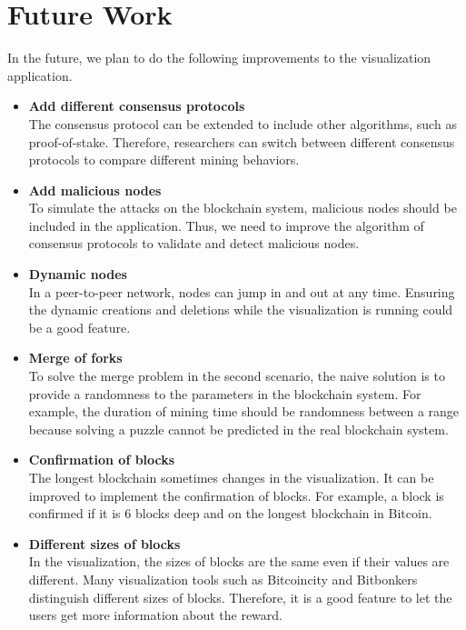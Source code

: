 \section{Future Work}

In the future, we plan to do the following improvements to the visualization application.

\begin{itemize}
    \item \textbf{Add different consensus protocols} \\
        The consensus protocol can be extended to include other algorithms, such as proof-of-stake. Therefore, researchers can switch between different consensus protocols to compare different mining behaviors.
    \item \textbf{Add malicious nodes} \\
        To simulate the attacks on the blockchain system, malicious nodes should be included in the application. Thus, we need to improve the algorithm of consensus protocols to validate and detect malicious nodes.
    \item \textbf{Dynamic nodes} \\
        In a peer-to-peer network, nodes can jump in and out at any time. Ensuring the dynamic creations and deletions while the visualization is running could be a good feature.
    \item \textbf{Merge of forks} \\
        To solve the merge problem in the second scenario, the naive solution is to provide a randomness to the parameters in the blockchain system. For example, the duration of mining time should be randomness between a range because solving a puzzle cannot be predicted in the real blockchain system.
    \item \textbf{Confirmation of blocks} \\
        The longest blockchain sometimes changes in the visualization. It can be improved to implement the confirmation of blocks. For example, a block is confirmed if it is 6 blocks deep and on the longest blockchain in Bitcoin.
    \item \textbf{Different sizes of blocks} \\
        In the visualization, the sizes of blocks are the same even if their values are different. Many visualization tools such as Bitcoincity and Bitbonkers distinguish different sizes of blocks. Therefore, it is a good feature to let the users get more information about the reward.
\end{itemize}
